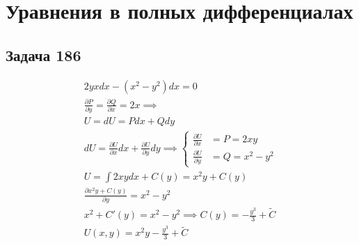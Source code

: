 \chapter{Уравнения в полных дифференциалах}

\section{Задача 186}
\begin{gather}
  2yxdx - (x^2-y^2)dx = 0 \\
  \frac{\partial P}{\partial y}=\frac{\partial Q}{\partial x}=2x\implies \\
  U = dU = Pdx+Qdy \\
  dU=\frac{\partial U}{\partial x}dx + \frac{\partial U}{\partial y}dy\implies
  \left\{ \begin{aligned}
    \frac{\partial U}{\partial x} &= P = 2xy \\
    \frac{\partial U}{\partial y} &= Q = x^2 - y^2
  \end{aligned} \right. \\
  U = \int 2xydx+C(y)=x^2y + C(y) \\
  \frac{\partial x^2y+C(y)}{\partial y}=x^2-y^2\\
  x^2+C'(y)=x^2-y^2 \implies 
  C(y)=-\frac{y^3}{3}+\widetilde{C}\\
   \boxed{ U(x,y)=x^2y-\frac{y^3}{3}+\widetilde{C} }
\end{gather}



